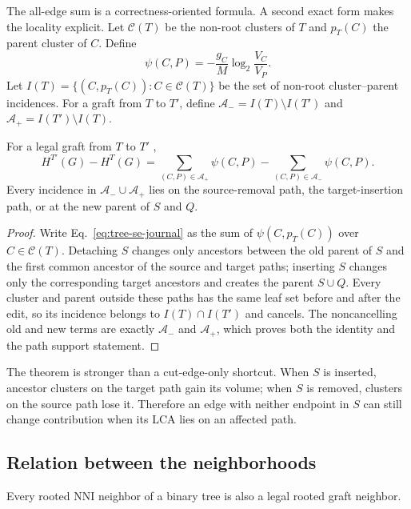 The all-edge sum is a correctness-oriented formula. A second exact form makes
the locality explicit. Let $\mathcal C(T)$ be the non-root clusters of $T$ and
$p_T(C)$ the parent cluster of $C$. Define
\[
 \psi(C,P)=-\frac{g_C}{M}\log_2\frac{V_C}{V_P}.
\]
Let $I(T)=\{(C,p_T(C)):C\in\mathcal C(T)\}$ be the set of non-root
cluster--parent incidences. For a graft from $T$ to $T'$, define
$\mathcal A_-=I(T)\setminus I(T')$ and
$\mathcal A_+=I(T')\setminus I(T)$.

\begin{theorem}\label{thm:graft-path}
For a legal graft from $T$ to $T'$ ,
\begin{equation}
 H^{T'}(G)-H^T(G)=
 \sum_{(C,P)\in\mathcal A_+}\psi(C,P)
 -\sum_{(C,P)\in\mathcal A_-}\psi(C,P).
 \label{eq:graft-path-delta}
\end{equation}
Every incidence in $\mathcal A_-\cup\mathcal A_+$ lies on the source-removal
path, the target-insertion path, or at the new parent of $S$ and $Q$.
\end{theorem}

\begin{proof}
Write Eq.~\eqref{eq:tree-se-journal} as the sum of $\psi(C,p_T(C))$ over
$C\in\mathcal C(T)$. Detaching $S$ changes only ancestors between the old
parent of $S$ and the first common ancestor of the source and target paths;
inserting $S$ changes only the corresponding target ancestors and creates the
parent $S\cup Q$. Every cluster and parent outside these paths has the same
leaf set before and after the edit, so its incidence belongs to
$I(T)\cap I(T')$ and cancels. The noncancelling old and new terms are exactly
$\mathcal A_-$ and $\mathcal A_+$, which proves both the identity and the path
support statement.
\end{proof}

The theorem is stronger than a cut-edge-only shortcut. When $S$ is inserted,
ancestor clusters on the target path gain its volume; when $S$ is removed,
clusters on the source path lose it. Therefore an edge with neither endpoint
in $S$ can still change contribution when its LCA lies on an affected path.

\subsection{Relation between the neighborhoods}

\begin{proposition}\label{prop:nni-is-graft}
Every rooted NNI neighbor of a binary tree is also a legal rooted graft
neighbor.
\end{proposition}

